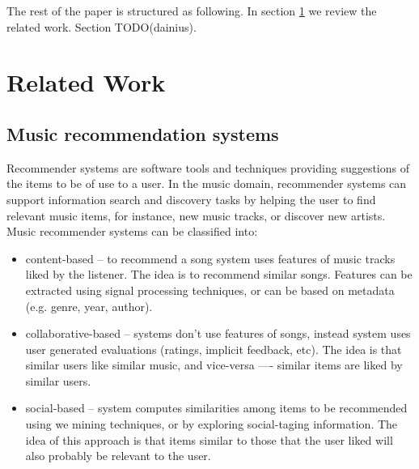 \documentclass{llncs}
\begin{document}
The rest of the paper is structured as following. In section \ref{related_work} we review the related work. Section TODO(dainius).





\section{Related Work}
\label{related_work}

\subsection{Music recommendation systems}
\label{music_recomendation_systems}

Recommender systems are software tools and techniques providing suggestions of the items to be of use to a user\cite{ricci2011recommender}. In the music domain, recommender systems can support information search and discovery tasks by helping the user to find relevant music items, for instance, new music tracks, or discover new artists\cite{celma2011if}. Music recommender systems can be classified into:
\begin{itemize}
	\item content-based -- to recommend a song system uses features of music tracks liked by the listener. The idea is to recommend similar songs. Features can be extracted using signal processing techniques, or can be based on metadata (e.g. genre, year, author).
	\item collaborative-based -- systems don't use features of songs, instead system uses user generated evaluations (ratings, implicit feedback, etc). The idea is that similar users like similar music, and vice-versa —- similar items are liked by similar users.
	\item social-based -- system computes similarities among items to be recommended using we mining techniques, or by exploring social-taging information. The idea of this approach is that items similar to those that the user liked will also probably be relevant to the user. 
\end{itemize}
\end{document}
